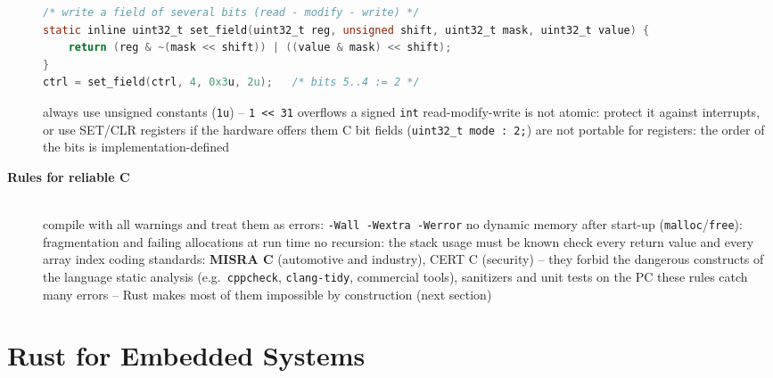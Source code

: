 \begin{description}
\begin{lstlisting}[language=C]
/* write a field of several bits (read - modify - write) */
static inline uint32_t set_field(uint32_t reg, unsigned shift, uint32_t mask, uint32_t value) {
    return (reg & ~(mask << shift)) | ((value & mask) << shift);
}
ctrl = set_field(ctrl, 4, 0x3u, 2u);   /* bits 5..4 := 2 */
\end{lstlisting}
\bi
	\ite always use unsigned constants (\texttt{1u}) -- \texttt{1 << 31} overflows a signed \texttt{int}
	\ite read-modify-write is not atomic: protect it against interrupts, or use SET/CLR registers if the hardware offers them
	\ite C bit fields (\texttt{uint32\_t mode : 2;}) are not portable for registers: the order of the bits is implementation-defined
\ei
\os{\newpage}

\item[{\rot\bf Rules for reliable C}]~\\[-\lblskip]
\bi
	\ite compile with all warnings and treat them as errors: \texttt{-Wall -Wextra -Werror}
	\ite no dynamic memory after start-up (\texttt{malloc}/\texttt{free}): fragmentation and failing allocations at run time
	\ite no recursion: the stack usage must be known
	\ite check every return value and every array index
	\ite coding standards: \textbf{MISRA C} (automotive and industry), CERT C (security) -- they forbid the dangerous constructs of the language
	\ite static analysis (e.g.\ \texttt{cppcheck}, \texttt{clang-tidy}, commercial tools), sanitizers and unit tests on the PC
	\ite these rules catch many errors -- Rust makes most of them impossible by construction (next section)
\ei
\os{\newpage}
\end{description}

\section{Rust for Embedded Systems}

